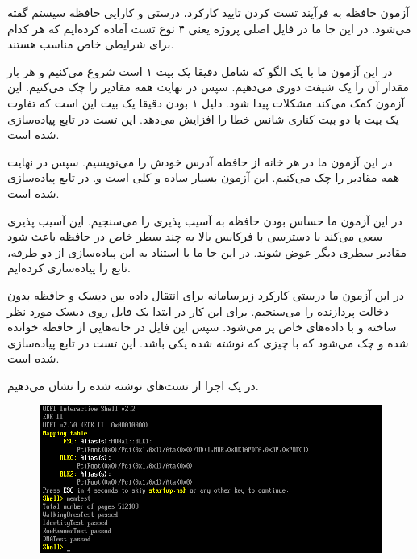 




آزمون حافظه به فرآیند تست کردن تایید کارکرد، درستی و کارایی حافظه سیستم گفته می‌شود. در این جا ما در فایل اصلی پروژه یعنی  ۴ نوع تست آماده کرده‌ایم که هر کدام برای شرایطی خاص مناسب هستند.



در این آزمون ما با یک الگو که شامل دقیقا یک بیت ۱ است شروع می‌کنیم و هر بار مقدار آن را یک شیفت دوری می‌دهیم. سپس در نهایت همه مقادیر را چک می‌کنیم. این آزمون کمک می‌کند مشکلات  پیدا شود. دلیل ۱ بودن دقیقا یک بیت این است که تفاوت یک بیت با دو بیت کناری شانس خطا را افزایش می‌دهد. این تست در تابع  پیاده‌سازی شده است.


در این آزمون ما در هر خانه از حافظه آدرس خودش را می‌نویسیم. سپس در نهایت همه مقادیر را چک می‌کنیم. این آزمون بسیار ساده و کلی است و. در تابع  پیاده‌سازی شده است.


در این آزمون ما حساس بودن حافظه به آسیب پذیری  را می‌سنجیم. این آسیب پذیری سعی می‌کند با دسترسی با فرکانس بالا به چند سطر خاص در حافظه باعث شود مقادیر سطری دیگر عوض شوند. در این جا ما با استناد به \href{https://github.com/google/rowhammer-test/blob/master/double_sided_rowhammer.cc}{این} پیاده‌سازی از  دو طرفه، تابع  را پیاده‌سازی کرده‌ایم.


در این آزمون ما درستی کارکرد زیرسامانه  برای انتقال داده بین دیسک و حافظه بدون دخالت پردازنده را می‌سنجیم. برای این کار در ابتدا یک فایل روی دیسک مورد نظر ساخته و با داده‌های خاص پر می‌شود. سپس این فایل در خانه‌هایی از حافظه خوانده شده و چک می‌شود که با چیزی که نوشته شده یکی باشد. این تست در تابع  پیاده‌سازی شده است.


در  یک اجرا از تست‌های نوشته شده را نشان می‌دهیم.
\begin{figure}
	\centering
	\includegraphics[width=0.7\linewidth]{figs/test/test1}
	\caption{}
	\label{fig:test1}
\end{figure}


